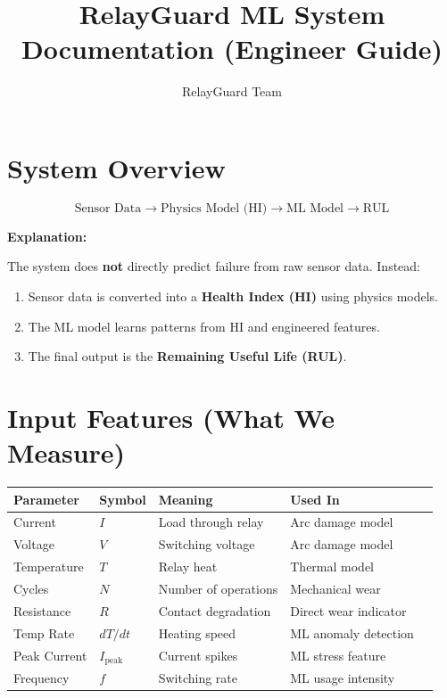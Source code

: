 \documentclass[12pt]{article}
\title{RelayGuard ML System Documentation (Engineer Guide)}
\author{RelayGuard Team}
\date{}
\begin{document}
\maketitle
\tableofcontents
\newpage


\section{System Overview}

\[
\text{Sensor Data} \rightarrow \text{Physics Model (HI)} \rightarrow \text{ML Model} \rightarrow \text{RUL}
\]

\textbf{Explanation:}

The system does \textbf{not} directly predict failure from raw sensor data. Instead:

\begin{enumerate}
  \item Sensor data is converted into a \textbf{Health Index (HI)} using physics models.
  \item The ML model learns patterns from HI and engineered features.
  \item The final output is the \textbf{Remaining Useful Life (RUL)}.
\end{enumerate}


\section{Input Features (What We Measure)}

\begin{table}[h]
\centering
\begin{tabular}{lllll}
\toprule
Parameter & Symbol & Meaning & Used In \\
\midrule
Current & $I$ & Load through relay & Arc damage model \\
Voltage & $V$ & Switching voltage & Arc damage model \\
Temperature & $T$ & Relay heat & Thermal model \\
Cycles & $N$ & Number of operations & Mechanical wear \\
Resistance & $R$ & Contact degradation & Direct wear indicator \\
Temp Rate & $dT/dt$ & Heating speed & ML anomaly detection \\
Peak Current & $I_{\text{peak}}$ & Current spikes & ML stress feature \\
Frequency & $f$ & Switching rate & ML usage intensity \\
\bottomrule
\end{tabular}
\end{table}
\end{document}
